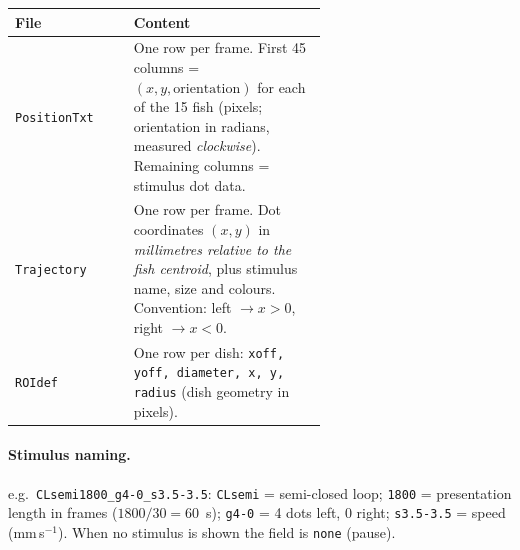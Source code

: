 \documentclass{article}
\begin{document}
\begin{table}[h]\centering\small
\begin{tabular}{@{}lp{0.62\linewidth}@{}}
\toprule
\textbf{File} & \textbf{Content}\\
\midrule
\texttt{PositionTxt} & One row per frame. First 45 columns = $(x,y,\text{orientation})$
  for each of the 15 fish (pixels; orientation in radians, measured
  \emph{clockwise}). Remaining columns = stimulus dot data.\\
\texttt{Trajectory}  & One row per frame. Dot coordinates $(x,y)$ in
  \emph{millimetres relative to the fish centroid}, plus stimulus name, size and
  colours. Convention: left $\to x>0$, right $\to x<0$.\\
\texttt{ROIdef}      & One row per dish: \texttt{xoff, yoff, diameter, x, y,
  radius} (dish geometry in pixels).\\
\bottomrule
\end{tabular}
\end{table}

\paragraph{Stimulus naming.} e.g.\ \texttt{CLsemi1800\_g4-0\_s3.5-3.5}:
\texttt{CLsemi} = semi-closed loop; \texttt{1800} = presentation length in frames
($1800/30 = 60$~s); \texttt{g4-0} = 4 dots left, 0 right; \texttt{s3.5-3.5} =
speed (mm\,s$^{-1}$). When no stimulus is shown the field is \texttt{none}
(pause).
\end{document}

